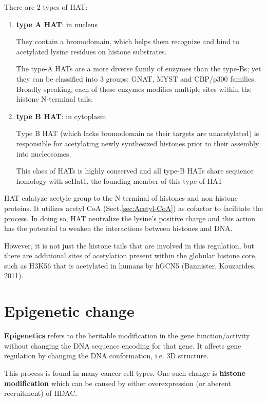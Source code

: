 There are 2 types of HAT:
\begin{enumerate}
  \item {\bf type A HAT}: in nucleus
  
  They contain a bromodomain, which helps them recognize and bind to acetylated
  lysine residues on histone substrates.

The type-A HATs are a more diverse family of enzymes than the type-Bs; yet they
can be classified into 3 groups: GNAT, MYST and CBP/p300 families.
Broadly speaking, each of these enzymes modifies multiple sites within the
histone N-terminal tails.
  
  \item {\bf type B HAT}: in cytoplasm
  
  Type B HAT (which lacks bromodomain as their targets are unacetylated) is
  responsible for acetylating newly synthesized histones prior to their assembly
  into nucleosomes.

This class of HATs is highly conserved and all type-B HATs share sequence
homology with scHat1, the founding member of this type of HAT
  
\end{enumerate}

HAT calatyze acetyle group to the N-terminal of histones and non-histone
proteins. It utilizes acetyl CoA (Sect.\ref{sec:Acetyl-CoA}) as cofactor to
facilitate the process. In doing so, HAT neutralize the lysine's positive charge
and this action has the potential to weaken the interactions between histones
and DNA.

However, it is not just the histone tails that are involved in this regulation,
but there are additional sites of acetylation present within the globular
histone core, such as H3K56 that is acetylated in humans by hGCN5 (Bannister,
Kouzarides, 2011).


\section{Epigenetic change}
\label{sec:epigenetic-change}

{\bf Epigenetics} refers to  the heritable modification in the gene
function/activity without changing the DNA sequence encoding for that gene.
It affects gene regulation by changing the DNA conformation, i.e. 3D structure.

This process is found in many cancer cell types.
One such change is {\bf histone modification} which can be caused by either
overexpression (or aberent recruitment) of HDAC.

